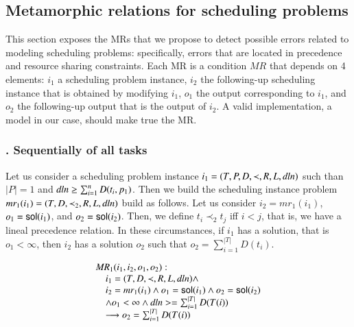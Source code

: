 \begin{comment}
\subsubsection{Operador de intercambio: CSWAP}
CSWAP: Este operador intercambia los parámetros 2 y 3, de la función de \texttt{cumulative} de Minizinc.
\end{comment}

\subsection{Metamorphic relations for scheduling problems}
\label{sec:def_MT}


This section exposes the MRs that we propose to detect possible errors
related to modeling scheduling problems: specifically, errors
that are located in precedence and resource sharing
constraints. Each MR is a condition $MR$ that depends
on 4 elements: $i_{1}$ a scheduling problem instance, $i_{2}$ the
following-up scheduling instance that is obtained by modifying
$i_{1}$, $o_{1}$ the output corresponding to $i_{1}$, and $o_{2}$ the
following-up output that is the output of $i_{2}$. A valid
implementation, a model in our case, should make true the MR.

\subsubsection{. Sequentially of all tasks}

Let us consider a scheduling problem instance $i_1 = (T, P, D, \prec, R,
L, \mathit{dln})$ such than $|P|=1$ and $\mathit{dln}\geq\sum_{i=1}^{n}D(t_{i},p_{1})$.
Then we build the scheduling instance problem
$mr_{1}(i_{1})=(T, D, \prec_{2}, R, L, \mathit{dln})$ build as follows. Let us
consider $i_{2}=mr_1(i_{1})$, $o_{1}=\mathsf{sol}(i_{1})$, and
$o_{2}=\mathsf{sol}(i_{2})$.
Then, we define $t_{i}\prec_{2} t_{j}$ iff $i<j$, that is, we have a lineal
precedence relation. In these circumstances, if $i_{1}$ has a
solution, that is $o_{1}<\infty$,
then $i_{2}$ has a solution $o_{2}$ such that
$o_{2}=\sum_{i=1}^{|T|}D(t_{i})$.

\begin{framed}
  \begin{displaymath}
      \begin{array}{l}
        \mathit{MR}_{1}(i_1,i_2,o_{1},o_{2}):\\
        \hskip 1em i_1=(T,D,\prec,R,L,\mathit{dln})\wedge  \\
        \hskip 1em i_2=mr_1(i_1)\wedge o_{1}=\mathsf{sol}(i_{1})\wedge o_{2}=\mathsf{sol}(i_2)\\
      \hskip 1em \wedge o_{1}<\infty\wedge \mathit{dln}>=\sum_{i=1}^{|T|}D(T(i)) \\
      \hskip 1em \longrightarrow o_2 = \sum_{i=1}^{|T|}D(T(i))
    \end{array}
  \end{displaymath}
\end{framed}






